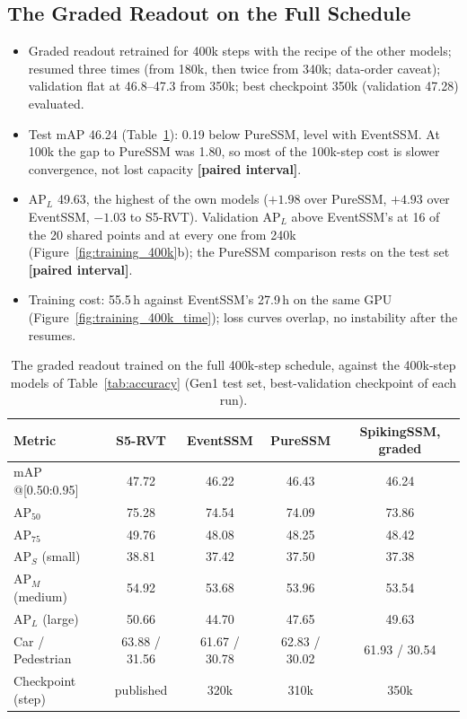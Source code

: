 \documentclass[11pt, a4paper]{report}
\newcommand{\res}[1]{{\color{red}\textbf{[#1]}}}
\begin{document}
\subsection{The Graded Readout on the Full Schedule}
\label{subsec:spk_full}
\begin{itemize}
  \item Graded readout retrained for 400k steps with the recipe of the other models; resumed three times (from 180k, then twice from 340k; data-order caveat); validation flat at 46.8--47.3 from 350k; best checkpoint 350k (validation 47.28) evaluated.
  \item Test mAP 46.24 (Table~\ref{tab:spiking_400k}): 0.19 below PureSSM, level with EventSSM. At 100k the gap to PureSSM was 1.80, so most of the 100k-step cost is slower convergence, not lost capacity \res{paired interval}.
  \item $\mathrm{AP}_L$ 49.63, the highest of the own models ($+1.98$ over PureSSM, $+4.93$ over EventSSM, $-1.03$ to S5-RVT). Validation $\mathrm{AP}_L$ above EventSSM's at 16 of the 20 shared points and at every one from 240k (Figure~\ref{fig:training_400k}b); the PureSSM comparison rests on the test set \res{paired interval}.
  \item Training cost: 55.5\,h against EventSSM's 27.9\,h on the same GPU (Figure~\ref{fig:training_400k_time}); loss curves overlap, no instability after the resumes.
\end{itemize}
\begin{table}[htbp]
\centering
\caption{The graded readout trained on the full 400k-step schedule, against the 400k-step models of
Table~\ref{tab:accuracy} (Gen1 test set, best-validation checkpoint of each run).}
\label{tab:spiking_400k}
\begin{tabular}{lcccc}
\toprule
\textbf{Metric} & \textbf{S5-RVT} & \textbf{EventSSM} & \textbf{PureSSM} & \textbf{SpikingSSM, graded} \\
\midrule
mAP @[0.50:0.95]        & 47.72 & 46.22 & 46.43 & 46.24 \\
$\mathrm{AP}_{50}$      & 75.28 & 74.54 & 74.09 & 73.86 \\
$\mathrm{AP}_{75}$      & 49.76 & 48.08 & 48.25 & 48.42 \\
$\mathrm{AP}_S$ (small) & 38.81 & 37.42 & 37.50 & 37.38 \\
$\mathrm{AP}_M$ (medium)& 54.92 & 53.68 & 53.96 & 53.54 \\
$\mathrm{AP}_L$ (large) & 50.66 & 44.70 & 47.65 & 49.63 \\
\midrule
Car / Pedestrian        & 63.88 / 31.56 & 61.67 / 30.78 & 62.83 / 30.02 & 61.93 / 30.54 \\
Checkpoint (step)       & published & 320k & 310k & 350k \\
\bottomrule
\end{tabular}
\end{table}
\end{document}
